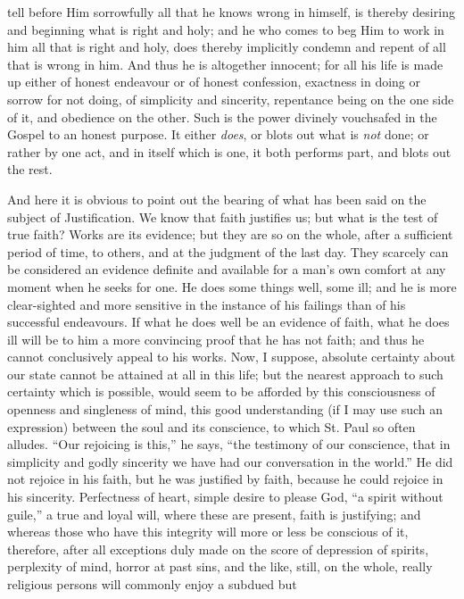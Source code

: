 tell before Him sorrowfully all that he knows wrong in himself, is
thereby desiring and beginning what is right and holy; and he who
comes to beg Him to work in him all that is right and holy, does
thereby implicitly condemn and repent of all that is wrong in him. And
thus he is altogether innocent; for all his life is made up either of
honest endeavour or of honest confession, exactness in doing or sorrow
for not doing, of simplicity and sincerity, repentance being on the
one side of it, and obedience on the other. Such is the power divinely
vouchsafed in the Gospel to an honest purpose. It either \emph{does},
or blots out what is \emph{not} done; or rather by one act, and in
itself which is one, it both performs part, and blots out the rest.

And here it is obvious to point out the bearing of what has been
said on the subject of Justification. We know that faith justifies us;
but what is the test of true faith? Works are its evidence; but they
are so on the whole, after a sufficient period of time, to others, and
at the judgment of the last day. They scarcely can be considered an
evidence definite and available for a man's own comfort at any moment
when he seeks for one. He does some things well, some ill; and he is
more clear-sighted and more sensitive in the instance of his failings
than of his successful endeavours. If what he does well be an evidence
of faith, what he does ill will be to him a more convincing proof that
he has not faith; and thus he cannot conclusively appeal to his works.
Now, I suppose, absolute certainty about our state cannot be attained
at all in this life; but the nearest approach to such certainty which
is possible, would seem to be afforded by this consciousness of
openness and singleness of mind, this good understanding (if I may use
such an expression) between the soul and its conscience, to which St.
Paul so often alludes. ``Our rejoicing is this,'' he says,
``the testimony of our conscience, that in simplicity and godly
sincerity we have had our conversation in the world.'' He did not
rejoice in his faith, but he was justified by faith, because he could
rejoice in his sincerity. Perfectness of heart, simple desire to
please God, ``a spirit without guile,'' a true and loyal will,
where these are present, faith is justifying; and whereas those who
have this integrity will more or less be conscious of it, therefore,
after all exceptions duly made on the score of depression of spirits,
perplexity of mind, horror at past sins, and the like, still, on the
whole, really religious persons will commonly enjoy a subdued but
